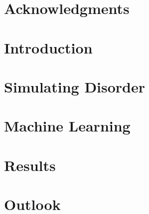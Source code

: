 \documentclass[12pt, oneside]{book}
\begin{document}
\chapter{Acknowledgments}


\tableofcontents

\listoffigures

\mainmatter

\chapter{Introduction}


\chapter{Simulating Disorder}


\chapter{Machine Learning}


\chapter{Results}


\chapter{Outlook}

\end{document}
